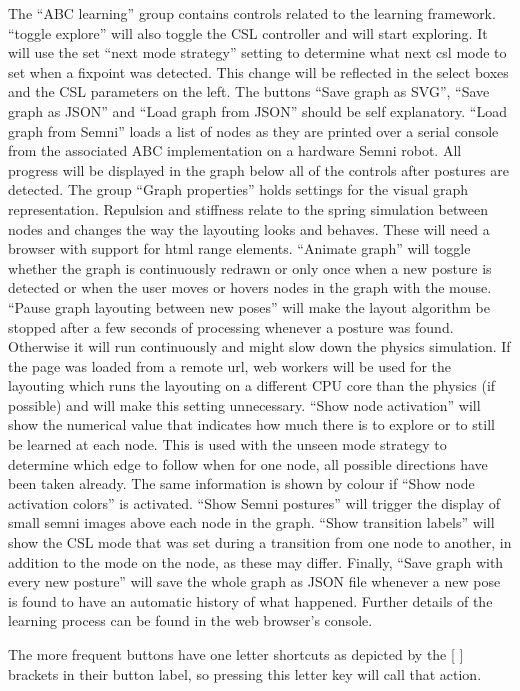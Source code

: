 \documentclass[10pt,a4paper]{article}
\begin{document}
The ``ABC learning'' group contains controls related to the learning framework. ``toggle explore'' will
also toggle the CSL controller and will start exploring. It will use the set ``next mode strategy''
setting to determine what next csl mode to set when a fixpoint was detected. This change will be
reflected in the select boxes and the CSL parameters on the left.  The buttons ``Save graph as SVG'',
``Save graph as JSON'' and ``Load graph from JSON'' should be self explanatory. ``Load graph from
Semni'' loads a list of nodes as they are printed over a serial console from the associated ABC
implementation on a hardware Semni robot.  All progress will be displayed in the graph below all of
the controls after postures are detected. The group ``Graph properties'' holds settings for the visual
graph representation. Repulsion and stiffness relate to the spring simulation between nodes and
changes the way the layouting looks and behaves. These will need a browser with support for html
range elements. ``Animate graph'' will toggle whether the graph is continuously redrawn or only once
when a new posture is detected or when the user moves or hovers nodes in the graph with the mouse.
``Pause graph layouting between new poses'' will make the layout algorithm be stopped after a few
seconds of processing whenever a posture was found. Otherwise it will run continuously and might
slow down the physics simulation. If the page was loaded from a remote url, web workers will be used
for the layouting which runs the layouting on a different CPU core than the physics (if possible)
and will make this setting unnecessary. ``Show node activation'' will show the numerical value that
indicates how much there is to explore or to still be learned at each node. This is used with the
unseen mode strategy to determine which edge to follow when for one node, all possible directions
have been taken already. The same information is shown by colour if ``Show node activation colors'' is
activated. ``Show Semni postures'' will trigger the display of small semni images above each node in
the graph. ``Show transition labels'' will show the CSL mode that was set during a transition from one
node to another, in addition to the mode on the node, as these may differ. Finally, ``Save graph with
every new posture'' will save the whole graph as JSON file whenever a new pose is found to have an
automatic history of what happened.  Further details of the learning process can be found in the web
browser's console.

The more frequent buttons have one letter shortcuts as depicted by the [ ] brackets in their button
label, so pressing this letter key will call that action.
\end{document}
